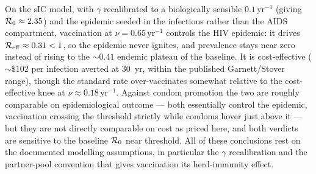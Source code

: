 On the sIC model, with $\gamma$ recalibrated to a biologically sensible
$0.1\,\text{yr}^{-1}$ (giving $\mathcal{R}_0\approx2.35$) and the epidemic seeded in the
infectious rather than the AIDS compartment, vaccination at $\nu=0.65\,\text{yr}^{-1}$
controls the HIV epidemic: it drives $\mathcal{R}_{\mathrm{eff}}\approx0.31<1$, so the epidemic never
ignites, and prevalence stays near zero instead of rising to the $\sim\!0.41$
endemic plateau of the baseline. It is cost-effective ($\sim\!\$102$ per infection
averted at 30~yr, within the published Garnett/Stover range), though the standard
rate over-vaccinates somewhat relative to the cost-effective knee at
$\nu\approx0.18\,\text{yr}^{-1}$. Against condom promotion the two are roughly
comparable on epidemiological outcome --- both essentially control the epidemic,
vaccination crossing the threshold strictly while condoms hover just above it --- but
they are not directly comparable on cost as priced here, and both verdicts are
sensitive to the baseline $\mathcal{R}_0$ near threshold. All of these conclusions rest on
the documented modelling assumptions, in particular the $\gamma$ recalibration and
the partner-pool convention that gives vaccination its herd-immunity effect.
